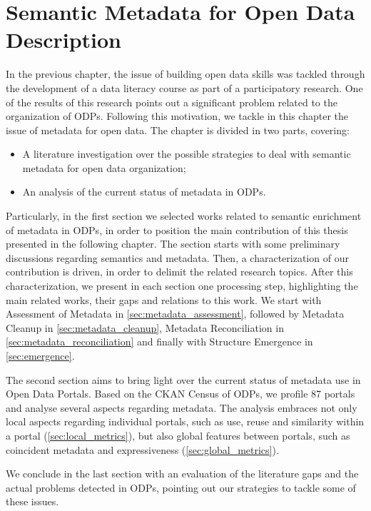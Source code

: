 \chapter{Semantic Metadata for Open Data Description}
\label{chap:relworks}

In the previous chapter, the issue of building open data skills was tackled through the development of a data literacy course as part of a participatory research.
One of the results of this research points out a significant problem related to the organization of ODPs.
Following this motivation, we tackle in this chapter the issue of metadata for open data. 
The chapter is divided in two parts, covering:

\begin{itemize}
	\item A literature investigation over the possible strategies to deal with semantic metadata for open data organization;
	\item An analysis of the current status of metadata in ODPs.
\end{itemize}

Particularly, in the first section we selected works related to semantic enrichment of metadata in ODPs, in order to position the main contribution of this thesis presented in the following chapter.
The section starts with some preliminary discussions regarding semantics and metadata.
Then, a characterization of our contribution is driven, in order to delimit the related research topics.
After this characterization, we present in each section one processing step, highlighting the main related works, their gaps and relations to this work.
We start with Assessment of Metadata in \autoref{sec:metadata_assessment}, followed by Metadata Cleanup in \autoref{sec:metadata_cleanup}, Metadata Reconciliation in \autoref{sec:metadata_reconciliation} and finally with Structure Emergence in \autoref{sec:emergence}.

The second section aims to bring light over the current status of metadata use in Open Data Portals.
Based on the CKAN Census of ODPs, we profile 87 portals and analyse several aspects regarding metadata.
The analysis embraces not only local aspects regarding individual portals, such as use, reuse and similarity within a portal (\autoref{sec:local_metrics}), but also global features between portals, such as coincident metadata and expressiveness (\autoref{sec:global_metrics}).

We conclude in the last section with an evaluation of the literature gaps and the actual problems detected in ODPs, pointing out our strategies to tackle some of these issues.

